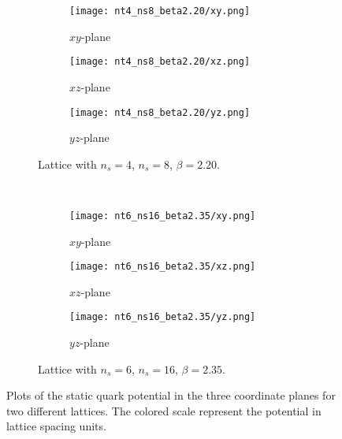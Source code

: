 \begin{figure}[!htbp]
    \centering
    \begin{subfigure}[t]{\textwidth}
        \centering
        \begin{subfigure}[t]{0.32\textwidth}
            \renewcommand\thesubfigure{\alph{subfigure}1}
            \texttt{[image: nt4\_ns8\_beta2.20/xy.png]}
            \caption{$xy$-plane}
            \label{4F:PotentialPlanes48xy}
        \end{subfigure}
        \hfill
        \begin{subfigure}[t]{0.32\textwidth}
            \addtocounter{subfigure}{-1}
            \renewcommand\thesubfigure{\alph{subfigure}2}
            \texttt{[image: nt4\_ns8\_beta2.20/xz.png]}
            \caption{$xz$-plane}
            \label{4F:PotentialPlanes48xz}
        \end{subfigure}
        \hfill
        \begin{subfigure}[t]{0.32\textwidth}
            \addtocounter{subfigure}{-1}
            \renewcommand\thesubfigure{\alph{subfigure}3}
            \texttt{[image: nt4\_ns8\_beta2.20/yz.png]}
            \caption{$yz$-plane}
            \label{4F:PotentialPlanes48yz}
        \end{subfigure}
        \addtocounter{subfigure}{-1}
        \caption{Lattice with $n_s=4$, $n_s=8$, $\beta=2.20$.}
        \label{4F:PotentialPlanes48}
    \end{subfigure}\\
    \vspace{\baselineskip}
    \begin{subfigure}[b]{\textwidth}
        \centering
        \begin{subfigure}[b]{0.32\textwidth}
            \renewcommand\thesubfigure{\alph{subfigure}1}
            \texttt{[image: nt6\_ns16\_beta2.35/xy.png]}
            \caption{$xy$-plane}
            \label{4F:PotentialPlanes616xy}
        \end{subfigure}
        \hfill
        \begin{subfigure}[b]{0.32\textwidth}
            \addtocounter{subfigure}{-1}
            \renewcommand\thesubfigure{\alph{subfigure}2}
            \texttt{[image: nt6\_ns16\_beta2.35/xz.png]}
            \caption{$xz$-plane}
            \label{4F:PotentialPlanes616xz}
        \end{subfigure}
        \hfill
        \begin{subfigure}[b]{0.32\textwidth}
            \addtocounter{subfigure}{-1}
            \renewcommand\thesubfigure{\alph{subfigure}3}
            \texttt{[image: nt6\_ns16\_beta2.35/yz.png]}
            \caption{$yz$-plane}
            \label{4F:PotentialPlanes616yz}
        \end{subfigure}
        \addtocounter{subfigure}{-1}
        \caption{Lattice with $n_s=6$, $n_s=16$, $\beta=2.35$.}
        \label{4F:PotentialPlanes616}
    \end{subfigure}
    \caption{Plots of the static quark potential in the three coordinate planes for two different lattices. The colored scale represent the potential in lattice spacing units.}
    \label{4F:PotentialPlanes}
\end{figure}
